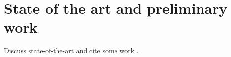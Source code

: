 \section{State of the art and preliminary work} \label{sec:stateOfTheArt}

Discuss state-of-the-art and cite some work \cite{976921}.